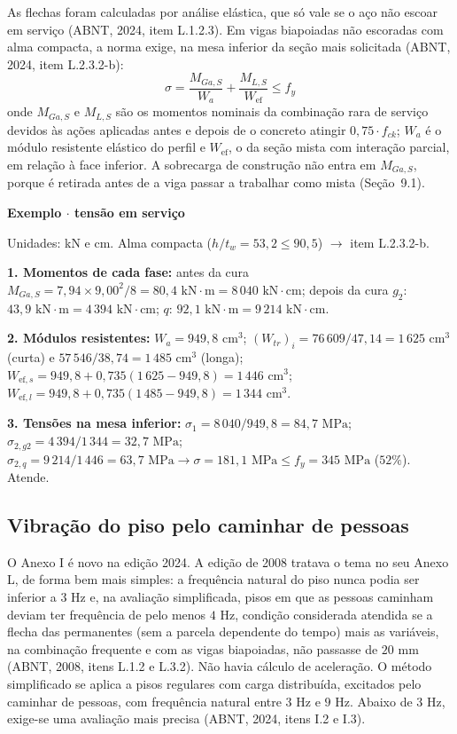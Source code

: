 \documentclass[11pt,a4paper]{article}
\newcommand{\caixaexemplo}[2]{%
  \par\vspace{6pt}\noindent\colorbox{examplebg}{%
    \parbox{\dimexpr\linewidth-2\fboxsep\relax}{%
      \vspace{4pt}\textbf{\color{exampleaccent}#1}\par\vspace{3pt}#2\vspace{4pt}%
    }%
  }\par\vspace{6pt}%
}
\begin{document}
As flechas foram calculadas por análise elástica, que só vale se o aço não escoar em serviço (ABNT, 2024, item L.1.2.3). Em vigas biapoiadas não escoradas com alma compacta, a norma exige, na mesa inferior da seção mais solicitada (ABNT, 2024, item L.2.3.2-b):
\begin{equation}
  \sigma = \frac{M_{Ga,S}}{W_a} + \frac{M_{L,S}}{W_{\text{ef}}} \le f_y
  \label{eq:tensao-servico-2}
\end{equation}
onde $M_{Ga,S}$ e $M_{L,S}$ são os momentos nominais da combinação rara de serviço devidos às ações aplicadas antes e depois de o concreto atingir $0{,}75\cdot f_{ck}$; $W_a$ é o módulo resistente elástico do perfil e $W_{\text{ef}}$, o da seção mista com interação parcial, em relação à face inferior. A sobrecarga de construção não entra em $M_{Ga,S}$, porque é retirada antes de a viga passar a trabalhar como mista (Seção~9.1).

\caixaexemplo{Exemplo $\cdot$ tensão em serviço}{%
Unidades: kN e cm. Alma compacta ($h/t_w = 53{,}2 \le 90{,}5$) $\rightarrow$ item L.2.3.2-b.\par
\textbf{1. Momentos de cada fase:} antes da cura $M_{Ga,S} = 7{,}94 \times 9{,}00^2/8 = 80{,}4\text{ kN}\cdot\text{m} = 8\,040\text{ kN}\cdot\text{cm}$; depois da cura $g_2$: $43{,}9\text{ kN}\cdot\text{m} = 4\,394\text{ kN}\cdot\text{cm}$; $q$: $92{,}1\text{ kN}\cdot\text{m} = 9\,214\text{ kN}\cdot\text{cm}$.\par
\textbf{2. Módulos resistentes:} $W_a = 949{,}8\text{ cm}^3$; $(W_{tr})_i = 76\,609/47{,}14 = 1\,625\text{ cm}^3$ (curta) e $57\,546/38{,}74 = 1\,485\text{ cm}^3$ (longa); $W_{\text{ef},s} = 949{,}8 + 0{,}735(1\,625 - 949{,}8) = 1\,446\text{ cm}^3$; $W_{\text{ef},l} = 949{,}8 + 0{,}735(1\,485 - 949{,}8) = 1\,344\text{ cm}^3$.\par
\textbf{3. Tensões na mesa inferior:} $\sigma_1 = 8\,040/949{,}8 = 84{,}7\text{ MPa}$; $\sigma_{2,g2} = 4\,394/1\,344 = 32{,}7\text{ MPa}$; $\sigma_{2,q} = 9\,214/1\,446 = 63{,}7\text{ MPa} \rightarrow \sigma = 181{,}1\text{ MPa} \le f_y = 345\text{ MPa}$ ($52\%$). Atende.}

\subsection{Vibração do piso pelo caminhar de pessoas}

O Anexo I é novo na edição 2024. A edição de 2008 tratava o tema no seu Anexo L, de forma bem mais simples: a frequência natural do piso nunca podia ser inferior a $3\text{ Hz}$ e, na avaliação simplificada, pisos em que as pessoas caminham deviam ter frequência de pelo menos $4\text{ Hz}$, condição considerada atendida se a flecha das permanentes (sem a parcela dependente do tempo) mais as variáveis, na combinação frequente e com as vigas biapoiadas, não passasse de $20\text{ mm}$ (ABNT, 2008, itens L.1.2 e L.3.2). Não havia cálculo de aceleração. O método simplificado se aplica a pisos regulares com carga distribuída, excitados pelo caminhar de pessoas, com frequência natural entre $3\text{ Hz}$ e $9\text{ Hz}$. Abaixo de $3\text{ Hz}$, exige-se uma avaliação mais precisa (ABNT, 2024, itens I.2 e I.3).
\end{document}
